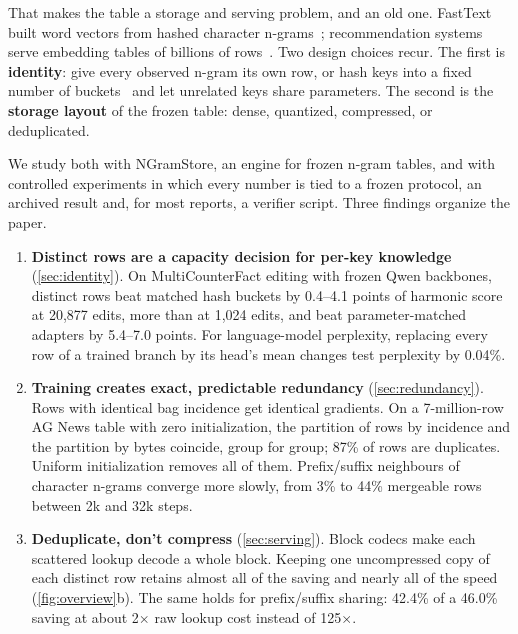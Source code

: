 \documentclass[10pt]{article}
\newcommand{\x}{$\times$}
\begin{document}
That makes the table a storage and serving problem, and an old one. FastText built word vectors from hashed character n-grams~\citep{bojanowski2017enriching}; recommendation systems serve embedding tables of billions of rows~\citep{naumov2019dlrm}. Two design choices recur. The first is \textbf{identity}: give every observed n-gram its own row, or hash keys into a fixed number of buckets~\citep{weinberger2009feature} and let unrelated keys share parameters. The second is the \textbf{storage layout} of the frozen table: dense, quantized, compressed, or deduplicated.

We study both with NGramStore, an engine for frozen n-gram tables, and with controlled experiments in which every number is tied to a frozen protocol, an archived result and, for most reports, a verifier script. Three findings organize the paper.

\begin{enumerate}[label=\arabic*.]
\item \textbf{Distinct rows are a capacity decision for per-key knowledge} (\cref{sec:identity}). On MultiCounterFact editing with frozen Qwen backbones, distinct rows beat matched hash buckets by 0.4--4.1 points of harmonic score at 20,877 edits, more than at 1,024 edits, and beat parameter-matched adapters by 5.4--7.0 points. For language-model perplexity, replacing every row of a trained branch by its head's mean changes test perplexity by 0.04\%.
\item \textbf{Training creates exact, predictable redundancy} (\cref{sec:redundancy}). Rows with identical bag incidence get identical gradients. On a 7-million-row AG News table with zero initialization, the partition of rows by incidence and the partition by bytes coincide, group for group; 87\% of rows are duplicates. Uniform initialization removes all of them. Prefix/suffix neighbours of character n-grams converge more slowly, from 3\% to 44\% mergeable rows between 2k and 32k steps.
\item \textbf{Deduplicate, don't compress} (\cref{sec:serving}). Block codecs make each scattered lookup decode a whole block. Keeping one uncompressed copy of each distinct row retains almost all of the saving and nearly all of the speed (\cref{fig:overview}b). The same holds for prefix/suffix sharing: 42.4\% of a 46.0\% saving at about 2\x{} raw lookup cost instead of 125\x.
\end{enumerate}
\end{document}
